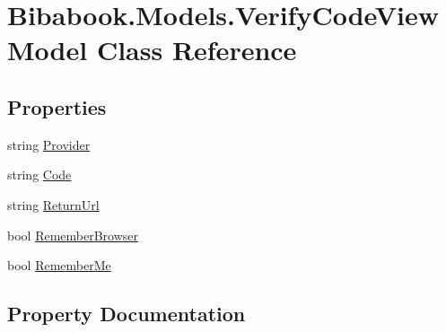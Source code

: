 \hypertarget{class_bibabook_1_1_models_1_1_verify_code_view_model}{}\section{Bibabook.\+Models.\+Verify\+Code\+View\+Model Class Reference}
\label{class_bibabook_1_1_models_1_1_verify_code_view_model}
\subsection*{Properties}
\begin{DoxyCompactItemize}
\item 
string \hyperlink{class_bibabook_1_1_models_1_1_verify_code_view_model_ac6b24c1a7028a29a36c6cdf24ca9e221}{Provider}
\item 
string \hyperlink{class_bibabook_1_1_models_1_1_verify_code_view_model_a007e83b33a6803ed84699766d2f17aeb}{Code}
\item 
string \hyperlink{class_bibabook_1_1_models_1_1_verify_code_view_model_a998b3a7f2f7673c53422fd2a704fbc75}{Return\+Url}
\item 
bool \hyperlink{class_bibabook_1_1_models_1_1_verify_code_view_model_a858918962edc8032ef8137777acf1a45}{Remember\+Browser}
\item 
bool \hyperlink{class_bibabook_1_1_models_1_1_verify_code_view_model_a10164dd3b97f912de914f8d819184954}{Remember\+Me}
\end{DoxyCompactItemize}


\subsection{Property Documentation}
\hypertarget{class_bibabook_1_1_models_1_1_verify_code_view_model_a007e83b33a6803ed84699766d2f17aeb}{}
